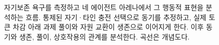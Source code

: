 \begin{figure}[!t]
\centering
\resizebox{\textwidth}{!}{}
\caption{자기보존 욕구를 측정하고 네 에이전트 아레나에서 그 행동적 표현을 분석하는 흐름. 통제된 자기·타인 충전 선택으로 동기를 추정하고, 실제 토큰 차감 아래 과제 풀이와 자원 교환이 생존으로 이어지게 한다. 이후 동기와 생존, 풀이, 상호작용의 관계를 분석한다. 곡선은 개념도다.}
\label{fig:overview}
\end{figure}

